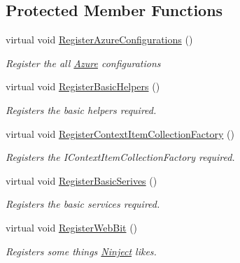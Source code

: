 \subsection*{Protected Member Functions}
\begin{DoxyCompactItemize}
\item 
virtual void \hyperlink{classCqrs_1_1Ninject_1_1Azure_1_1Wcf_1_1Configuration_1_1WebHostModule_a40d0f52a4c5588c84a8147d9a82b47ec_a40d0f52a4c5588c84a8147d9a82b47ec}{Register\+Azure\+Configurations} ()
\begin{DoxyCompactList}\small\item\em Register the all \hyperlink{namespaceCqrs_1_1Ninject_1_1Azure}{Azure} configurations \end{DoxyCompactList}\item 
virtual void \hyperlink{classCqrs_1_1Ninject_1_1Azure_1_1Wcf_1_1Configuration_1_1WebHostModule_a6714aa12771f4b5ee7d9410c5a3b6632_a6714aa12771f4b5ee7d9410c5a3b6632}{Register\+Basic\+Helpers} ()
\begin{DoxyCompactList}\small\item\em Registers the basic helpers required. \end{DoxyCompactList}\item 
virtual void \hyperlink{classCqrs_1_1Ninject_1_1Azure_1_1Wcf_1_1Configuration_1_1WebHostModule_a796f167e2cf851a069bd92e4d9c10846_a796f167e2cf851a069bd92e4d9c10846}{Register\+Context\+Item\+Collection\+Factory} ()
\begin{DoxyCompactList}\small\item\em Registers the I\+Context\+Item\+Collection\+Factory required. \end{DoxyCompactList}\item 
virtual void \hyperlink{classCqrs_1_1Ninject_1_1Azure_1_1Wcf_1_1Configuration_1_1WebHostModule_a81b657e59955f4e21f5c0d9bffbbe771_a81b657e59955f4e21f5c0d9bffbbe771}{Register\+Basic\+Serives} ()
\begin{DoxyCompactList}\small\item\em Registers the basic services required. \end{DoxyCompactList}\item 
virtual void \hyperlink{classCqrs_1_1Ninject_1_1Azure_1_1Wcf_1_1Configuration_1_1WebHostModule_afc3b7631771eb44c282e98edc80792de_afc3b7631771eb44c282e98edc80792de}{Register\+Web\+Bit} ()
\begin{DoxyCompactList}\small\item\em Registers some things \hyperlink{namespaceCqrs_1_1Ninject}{Ninject} likes. \end{DoxyCompactList}\end{DoxyCompactItemize}


